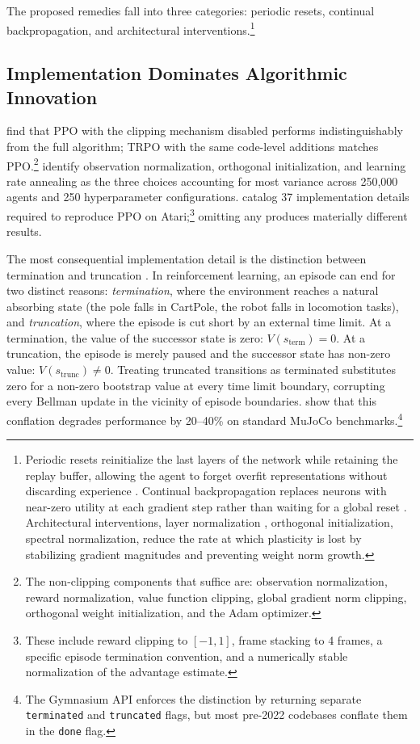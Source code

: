 The proposed remedies fall into three categories: periodic resets, continual backpropagation, and architectural interventions.\footnote{Periodic resets reinitialize the last layers of the network while retaining the replay buffer, allowing the agent to forget overfit representations without discarding experience \citep{Nikishin2022, Doro2023}. Continual backpropagation replaces neurons with near-zero utility at each gradient step rather than waiting for a global reset \citep{DohareEtAl2024}. Architectural interventions, layer normalization \citep{Lyle2025}, orthogonal initialization, spectral normalization, reduce the rate at which plasticity is lost by stabilizing gradient magnitudes and preventing weight norm growth.}

\subsection{Implementation Dominates Algorithmic Innovation}
\label{sec:implementation}

\citet{Engstrom2020} find that PPO with the clipping mechanism disabled performs indistinguishably from the full algorithm; TRPO \citep{Schulman2015} with the same code-level additions matches PPO.\footnote{The non-clipping components that suffice are: observation normalization, reward normalization, value function clipping, global gradient norm clipping, orthogonal weight initialization, and the Adam optimizer.} \citet{andrychowicz2021matters} identify observation normalization, orthogonal initialization, and learning rate annealing as the three choices accounting for most variance across 250,000 agents and 250 hyperparameter configurations. \citet{huang2022ppo} catalog 37 implementation details required to reproduce PPO on Atari;\footnote{These include reward clipping to $[-1, 1]$, frame stacking to 4 frames, a specific episode termination convention, and a numerically stable normalization of the advantage estimate.} omitting any produces materially different results.

The most consequential implementation detail is the distinction between termination and truncation \citep{pardo2018time}. In reinforcement learning, an episode can end for two distinct reasons: \emph{termination}, where the environment reaches a natural absorbing state (the pole falls in CartPole, the robot falls in locomotion tasks), and \emph{truncation}, where the episode is cut short by an external time limit. At a termination, the value of the successor state is zero: $V(s_\text{term}) = 0$. At a truncation, the episode is merely paused and the successor state has non-zero value: $V(s_\text{trunc}) \neq 0$. Treating truncated transitions as terminated substitutes zero for a non-zero bootstrap value at every time limit boundary, corrupting every Bellman update in the vicinity of episode boundaries. \citet{pardo2018time} show that this conflation degrades performance by 20--40\% on standard MuJoCo benchmarks.\footnote{The Gymnasium API \citep{Towers2024} enforces the distinction by returning separate \texttt{terminated} and \texttt{truncated} flags, but most pre-2022 codebases conflate them in the \texttt{done} flag.}

